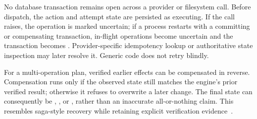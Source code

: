 No database transaction remains open across a provider or filesystem call. Before dispatch, the action and attempt state are persisted as executing. If the call raises, the operation is marked uncertain; if a process restarts with a committing or compensating transaction, in-flight operations become uncertain and the transaction becomes . Provider-specific idempotency lookup or authoritative state inspection may later resolve it. Generic code does not retry blindly.

For a multi-operation plan, verified earlier effects can be compensated in reverse. Compensation runs only if the observed state still matches the engine's prior verified result; otherwise it refuses to overwrite a later change. The final state can consequently be , , or , rather than an inaccurate all-or-nothing claim. This resembles saga-style recovery while retaining explicit verification evidence~\cite{garciamolina1987sagas}.
